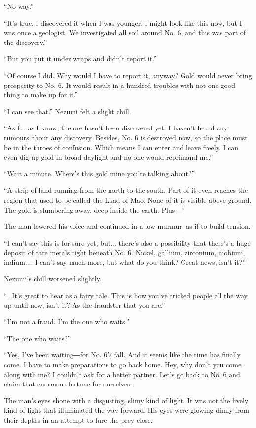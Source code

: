``No way.''

``It's true. I discovered it when I was younger. I might look like this
now, but I was once a geologist. We investigated all soil around No. 6,
and this was part of the discovery.''

``But you put it under wraps and didn't report it.''

``Of course I did. Why would I have to report it, anyway? Gold would
never bring prosperity to No. 6. It would result in a hundred troubles
with not one good thing to make up for it.''

``I can see that.'' Nezumi felt a slight chill.

``As far as I know, the ore hasn't been discovered yet. I haven't heard
any rumours about any discovery. Besides, No. 6 is destroyed now, so the
place must be in the throes of confusion. Which means I can enter and
leave freely. I can even dig up gold in broad daylight and no one would
reprimand me.''

``Wait a minute. Where's this gold mine you're talking about?''

``A strip of land running from the north to the south. Part of it even
reaches the region that used to be called the Land of Mao. None of it is
visible above ground. The gold is slumbering away, deep inside the
earth. Plus―''

The man lowered his voice and continued in a low murmur, as if to build
tension.

``I can't say this is for sure yet, but... there's also a possibility
that there's a huge deposit of rare metals right beneath No. 6. Nickel,
gallium, zirconium, niobium, indium.... I can't say much more, but what
do you think? Great news, isn't it?''

Nezumi's chill worsened slightly.

``...It's great to hear as a fairy tale. This is how you've tricked
people all the way up until now, isn't it? As the fraudster that you
are.''

``I'm not a fraud. I'm the one who waits.''

``The one who waits?''

``Yes, I've been waiting―for No. 6's fall. And it seems like the time
has finally come. I have to make preparations to go back home. Hey, why
don't you come along with me? I couldn't ask for a better partner. Let's
go back to No. 6 and claim that enormous fortune for ourselves.

The man's eyes shone with a disgusting, slimy kind of light. It was not
the lively kind of light that illuminated the way forward. His eyes were
glowing dimly from their depths in an attempt to lure the prey close.

